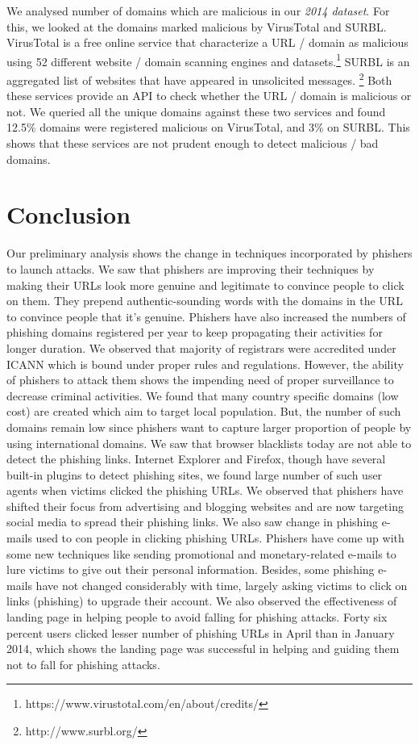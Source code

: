 \documentclass[conference]{IEEEtran}
\begin{document}
We analysed number of domains which are malicious in our \textit{2014 dataset}. For this, we looked at the domains marked malicious by VirusTotal and SURBL. VirusTotal is a free online service that characterize a URL / domain as malicious using 52 different website / domain scanning engines and datasets.\footnote{https://www.virustotal.com/en/about/credits/} SURBL is an aggregated list of websites that have appeared in unsolicited messages. \footnote{http://www.surbl.org/} Both these services provide an API to check whether the URL / domain is malicious or not. We queried all the unique domains against these two services and found 12.5\% domains were registered malicious on VirusTotal, and 3\% on SURBL. This shows that these services are not prudent enough to detect malicious / bad domains.

\section{Conclusion}
Our preliminary analysis shows the change in techniques incorporated by phishers to launch attacks. We saw that phishers are improving their techniques by making their URLs look more genuine and legitimate to convince people to click on them. They prepend authentic-sounding words with the domains in the URL to convince people that it's genuine. Phishers have also increased the numbers of phishing domains registered per year to keep propagating their activities for longer duration. We observed that majority of registrars were accredited under ICANN which is bound under proper rules and regulations. However, the ability of phishers to attack them shows the impending need of proper surveillance to decrease criminal activities. We found that many country specific domains (low cost) are created which aim to target local population. But, the number of such domains remain low since phishers want to capture larger proportion of people by using international domains.
\newline\indent
We saw that browser blacklists today are not able to detect the phishing links. Internet Explorer and Firefox, though have several built-in plugins to detect phishing sites, we found large number of such user agents when victims clicked the phishing URLs. We observed that phishers have shifted their focus from advertising and blogging websites and are now targeting social media to spread their phishing links. We also saw change in phishing e-mails used to con people in clicking phishing URLs. Phishers have come up with some new techniques like sending promotional and monetary-related e-mails to lure victims to give out their personal information. Besides, some phishing e-mails have not changed considerably with time, largely asking victims to click on links (phishing) to upgrade their account. We also observed the effectiveness of landing page in helping people to avoid falling for phishing attacks. Forty six percent users clicked lesser number of phishing URLs in April than in January 2014, which shows the landing page was successful in helping and guiding them not to fall for phishing attacks.
\end{document}
